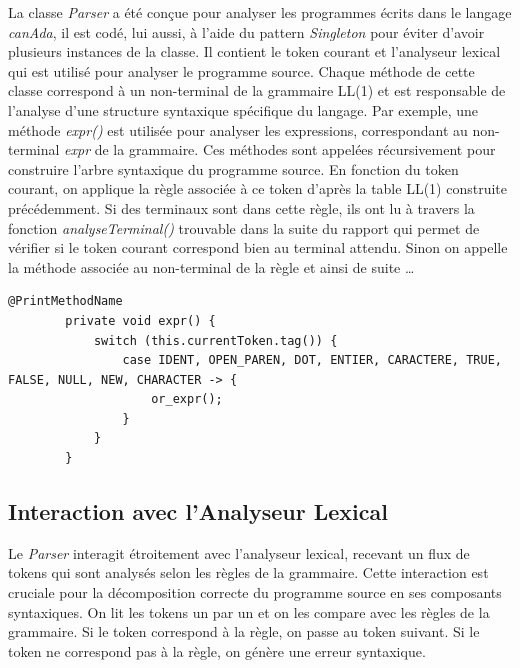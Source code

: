\documentclass[french,a4paper]{article}
\begin{document}
    La classe \textit{Parser} a été conçue pour analyser les programmes écrits dans le langage \textit{canAda}, il est codé, lui aussi, à l'aide du pattern \textit{Singleton} pour éviter d'avoir plusieurs instances de la classe.
    Il contient le token courant et l'analyseur lexical qui est utilisé pour analyser le programme source.
    Chaque méthode de cette classe correspond à un non-terminal de la grammaire LL(1) et est responsable de l'analyse d'une structure syntaxique spécifique du langage.
    Par exemple, une méthode \textit{expr()} est utilisée pour analyser les expressions, correspondant au non-terminal \textit{expr} de la grammaire.
    Ces méthodes sont appelées récursivement pour construire l'arbre syntaxique du programme source.
    En fonction du token courant, on applique la règle associée à ce token d'après la table LL(1) construite précédemment.
    Si des terminaux sont dans cette règle, ils ont lu à travers la fonction \textit{analyseTerminal()} trouvable dans la suite du rapport qui permet de vérifier si le token courant correspond bien au terminal attendu.
    Sinon on appelle la méthode associée au non-terminal de la règle et ainsi de suite \dots

    \begin{lstlisting}[label={lst:lstlisting10}]
        @PrintMethodName
        private void expr() {
            switch (this.currentToken.tag()) {
                case IDENT, OPEN_PAREN, DOT, ENTIER, CARACTERE, TRUE, FALSE, NULL, NEW, CHARACTER -> {
                    or_expr();
                }
            }
        }
    \end{lstlisting}


    \subsection{Interaction avec l'Analyseur Lexical}\label{subsec:interaction-avec-l'analyseur-lexical}

    Le \textit{Parser} interagit étroitement avec l'analyseur lexical, recevant un flux de tokens qui sont analysés selon les règles de la grammaire.
    Cette interaction est cruciale pour la décomposition correcte du programme source en ses composants syntaxiques.
    On lit les tokens un par un et on les compare avec les règles de la grammaire.
    Si le token correspond à la règle, on passe au token suivant.
    Si le token ne correspond pas à la règle, on génère une erreur syntaxique.
\end{document}
